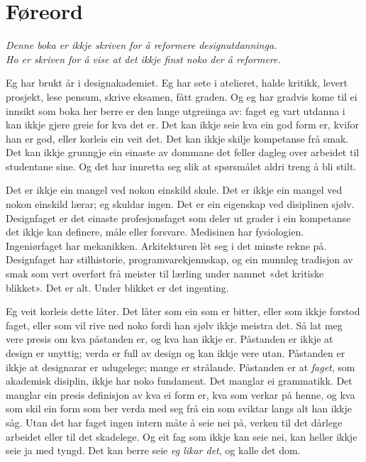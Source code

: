 \chapter*{Føreord}

\begin{center}\itshape
Denne boka er ikkje skriven for å reformere designutdanninga.\\
Ho er skriven for å vise at det ikkje finst noko der å reformere.
\end{center}
\vspace{8mm}

Eg har brukt år i designakademiet. Eg har sete i atelieret, halde kritikk, levert prosjekt, lese pensum, skrive eksamen, fått graden. Og eg har gradvis kome til ei innsikt som boka her berre er den lange utgreiinga av: faget eg vart utdanna i kan ikkje gjere greie for kva det er. Det kan ikkje seie kva ein god form er, kvifor han er god, eller korleis ein veit det. Det kan ikkje skilje kompetanse frå smak. Det kan ikkje grunngje ein einaste av dommane det feller dagleg over arbeidet til studentane sine. Og det har innretta seg slik at spørsmålet aldri treng å bli stilt.

Det er ikkje ein mangel ved nokon einskild skule. Det er ikkje ein mangel ved nokon einskild lærar; eg skuldar ingen. Det er ein eigenskap ved disiplinen sjølv. Designfaget er det einaste profesjonsfaget som deler ut grader i ein kompetanse det ikkje kan definere, måle eller forsvare. Medisinen har fysiologien. Ingeniørfaget har mekanikken. Arkitekturen lèt seg i det minste rekne på. Designfaget har stilhistorie, programvarekjennskap, og ein munnleg tradisjon av smak som vert overført frå meister til lærling under namnet «det kritiske blikket». Det er alt. Under blikket er det ingenting.

Eg veit korleis dette låter. Det låter som ein som er bitter, eller som ikkje forstod faget, eller som vil rive ned noko fordi han sjølv ikkje meistra det. Så lat meg vere presis om kva påstanden er, og kva han ikkje er. Påstanden er ikkje at design er unyttig; verda er full av design og kan ikkje vere utan. Påstanden er ikkje at designarar er udugelege; mange er strålande. Påstanden er at \emph{faget}, som akademisk disiplin, ikkje har noko fundament. Det manglar ei grammatikk. Det manglar ein presis definisjon av kva ei form er, kva som verkar på henne, og kva som skil ein form som ber verda med seg frå ein som sviktar langs alt han ikkje såg. Utan det har faget ingen intern måte å seie nei på, verken til det dårlege arbeidet eller til det skadelege. Og eit fag som ikkje kan seie nei, kan heller ikkje seie ja med tyngd. Det kan berre seie \emph{eg likar det}, og kalle det dom.

